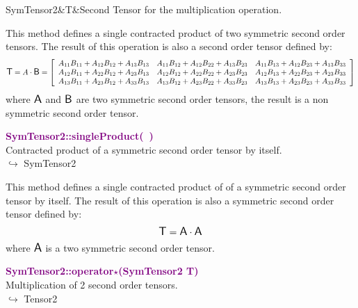 \begin{tcolorbox}[width=\textwidth,myArgs,tabularx={ll|R}]
SymTensor2&T&Second Tensor for the multiplication operation.
\end{tcolorbox}

This method defines a single contracted product of two symmetric second order tensors.
The result of this operation is also a second order tensor defined by:
\begin{equation*}
\mbox{\large\ensuremath{\mathsf{T}}}=A \cdot \mbox{\large\ensuremath{\mathsf{B}}}=\left[\begin{array}{ccc}
A_{11} B_{11} + A_{12} B_{12} + A_{13} B_{13} & A_{11} B_{12} + A_{12} B_{22} + A_{13} B_{23} & A_{11} B_{13} + A_{12} B_{23} + A_{13} B_{33} \\
A_{12} B_{11} + A_{22} B_{12} + A_{23} B_{13} & A_{12} B_{12} + A_{22} B_{22} + A_{23} B_{23} & A_{12} B_{13} + A_{22} B_{23} + A_{23} B_{33} \\
A_{13} B_{11} + A_{23} B_{12} + A_{33} B_{13} & A_{13} B_{12} + A_{23} B_{22} + A_{33} B_{23} & A_{13} B_{13} + A_{23} B_{23} + A_{33} B_{33}
\end{array}\right]
\end{equation*}
where $\mbox{\large\ensuremath{\mathsf{A}}}$ and $\mbox{\large\ensuremath{\mathsf{B}}}$ are two symmetric second order tensors, the result is a non symmetric second order tensor.

\textcolor{purple}{\textbf{SymTensor2::singleProduct(~)}}\label{SymTensor2::singleProduct()}\\
Contracted product of a symmetric second order tensor by itself.\\ \hspace*{10mm}$\hookrightarrow$ SymTensor2

This method defines a single contracted product of of a symmetric second order tensor by itself.
The result of this operation is also a symmetric second order tensor defined by:
\begin{equation*}
\mbox{\large\ensuremath{\mathsf{T}}} = \mbox{\large\ensuremath{\mathsf{A}}} \cdot \mbox{\large\ensuremath{\mathsf{A}}}
\end{equation*}
where $\mbox{\large\ensuremath{\mathsf{A}}}$ is a two symmetric second order tensor.

\textcolor{purple}{\textbf{SymTensor2::operator$\star$(SymTensor2 T)}}\label{SymTensor2::operator*(SymTensor2 T)}\\
Multiplication of 2 second order tensors.\\ \hspace*{10mm}$\hookrightarrow$ Tensor2

